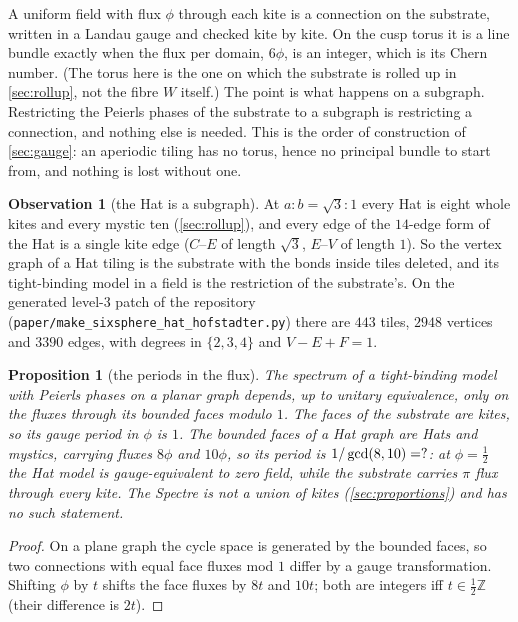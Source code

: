 \documentclass[11pt,a4paper]{article}
\newcommand{\ZZ}{\mathbb{Z}}
\theoremstyle{plain}
\newtheorem{proposition}{Proposition}
\theoremstyle{definition}
\newtheorem{observation}{Observation}
\begin{document}
A uniform field with flux $\phi$ through each kite is a connection on the substrate, written
in a Landau gauge and checked kite by kite. On the cusp torus it is a line bundle exactly when the flux per
domain, $6\phi$, is an integer, which is its Chern number. (The torus here is the one on which the substrate is rolled up in \cref{sec:rollup}, not the
fibre $W$ itself.) The point is what happens on a subgraph. Restricting the Peierls phases of the substrate to a
subgraph is restricting a connection, and nothing else is needed. This is the
order of construction of \cref{sec:gauge}: an aperiodic tiling has no torus, hence no principal bundle to start from, and
nothing is lost without one.

\begin{observation}[the Hat is a subgraph]
\label{obs:ho-subgraph}
At $a:b=\sqrt3:1$ every Hat is eight whole kites and every mystic ten
(\cref{sec:rollup}), and every edge of the $14$-edge form of the Hat is a single kite edge ($C$--$E$ of
length $\sqrt3$, $E$--$V$ of length $1$). So the vertex graph of a Hat tiling is the substrate with the bonds
inside tiles deleted, and its tight-binding model in a field is the restriction of the substrate's. On the generated level-$3$ patch
of the repository (\texttt{paper/make\_sixsphere\_hat\_hofstadter.py}) there are $443$ tiles,
$2948$ vertices and $3390$ edges, with degrees in $\{2,3,4\}$ and $V-E+F=1$.
\end{observation}

\begin{proposition}[the periods in the flux]
\label{prop:ho-period}
The spectrum of a tight-binding model with Peierls phases on a planar graph depends, up to
unitary equivalence, only on the fluxes through its bounded faces modulo $1$. The faces of the substrate are kites, so
its gauge period in $\phi$ is $1$. The bounded faces of a Hat graph are Hats and mystics, carrying fluxes $8\phi$ and $10\phi$, so its period is
$1/\gcd(8,10)=?$: at $\phi=\tfrac12$ the Hat model is gauge-equivalent to zero field,
while the substrate carries $\pi$ flux through every kite. The Spectre is not a union of kites (\cref{sec:proportions}) and has no
such statement.
\end{proposition}

\begin{proof}
On a plane graph the cycle space is generated by the bounded faces, so two connections with equal face fluxes mod $1$ differ by
a gauge transformation. Shifting $\phi$ by $t$ shifts the face fluxes by $8t$ and $10t$; both are integers
iff $t\in\tfrac12\ZZ$ (their difference is $2t$).
\end{proof}
\end{document}
